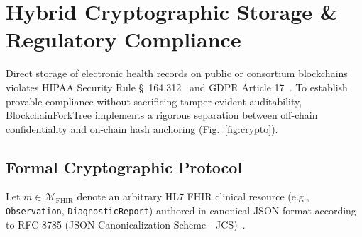 \documentclass[journal]{IEEEtran}
\theoremstyle{definition}
\begin{document}
\section{Hybrid Cryptographic Storage \& Regulatory Compliance}
Direct storage of electronic health records on public or consortium blockchains violates HIPAA Security Rule \S~164.312~\cite{hipaa1996} and GDPR Article 17~\cite{gdpr2016, politou2018forgetting}. To establish provable compliance without sacrificing tamper-evident auditability, BlockchainForkTree implements a rigorous separation between off-chain confidentiality and on-chain hash anchoring (Fig.~\ref{fig:crypto}).

\subsection{Formal Cryptographic Protocol}
Let $m \in \mathcal{M}_{\text{FHIR}}$ denote an arbitrary HL7 FHIR clinical resource (e.g., \texttt{Observation}, \texttt{DiagnosticReport}) authored in canonical JSON format according to RFC 8785 (JSON Canonicalization Scheme - JCS)~\cite{rundgren2020json}.
\end{document}
